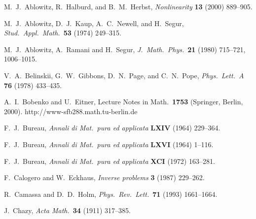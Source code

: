 \documentclass[10pt]{article}
\begin{document}
\begin{thebibliography}{99}

 M.~J.~Ablowitz, R.~Halburd, and B.~M.~Herbst,
{\it Nonlinearity} {\bf 13} (2000) 889--905. 

 M.~J.~Ablowitz, D.~J.~Kaup, A.~C.~Newell, and H.~Segur,
{\it Stud.~Appl.~Math.}~{\bf 53} (1974) 249--315.

 M.~J.~Ablowitz, A.~Ramani and H.~Segur,
{\it J.~Math.~Phys.}~{\bf 21} (1980) 715--721, 1006--1015.

 V.~A.~Belinskii, G.~W.~Gibbons, D.~N.~Page, and C.~N.~Pope,
{\it Phys.~Lett.~A} {\bf 76} (1978) 433--435.

 A.~I.~Bobenko and U.~Eitner,
Lecture Notes in Math.~{\bf 1753} (Springer, Berlin, 2000).
http://www-sfb288.math.tu-berlin.de

 F.~J.~Bureau,
{\it Annali di Mat.~pura ed applicata} {\bf LXIV} (1964) 229--364.
 
 F.~J.~Bureau,
{\it Annali di Mat.~pura ed applicata} {\bf LXVI} (1964) 1--116.

 F.~J.~Bureau,
{\it Annali di Mat.~pura ed applicata} {\bf XCI} (1972) 163--281.

 F.~Calogero and W.~Eckhaus,
{\it Inverse problems} {\bf 3} (1987) 229--262.

 R.~Camassa and D.~D.~Holm, 
{\it Phys.~Rev.~Lett.}~{\bf 71} (1993) 1661--1664.

 J.~Chazy,    
{\it Acta Math.}~{\bf 34} (1911) 317--385.


\end{thebibliography}
\end{document}
